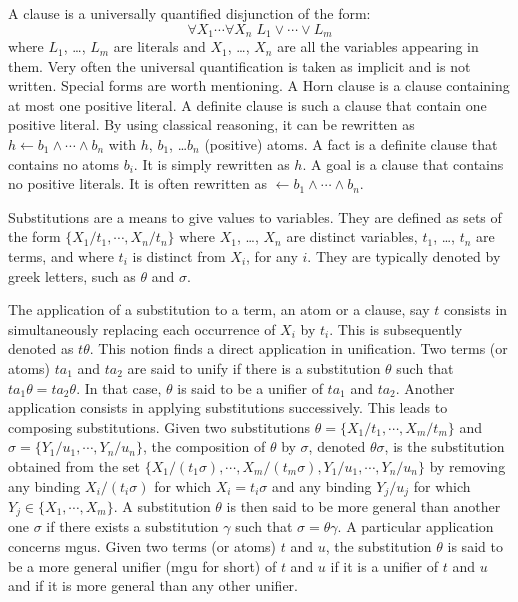 A clause is a universally quantified disjunction of the form:
\[ \forall X_1 \cdots \forall X_n \; L_1 \vee \cdots \vee L_m \]
where $L_1$, \ldots, $L_m$ are literals and $X_1$, \ldots, $X_n$ are all the variables appearing in them. 
Very often the universal quantification is taken as implicit and is not
written.  Special forms are worth mentioning.
A Horn clause is a clause containing at most one positive literal. A
definite clause is such a clause that contain one positive
literal. By using classical reasoning, 
it can be rewritten as
\( h \leftarrow b_1 \wedge \cdots \wedge b_n \)
with $h$, $b_1$, \ldots $b_n$ (positive) atoms.
A fact is a definite clause that contains no atoms $b_i$. It is simply rewritten as \( h \).
A goal is a clause that contains no positive literals. It is often rewritten as 
\( \leftarrow b_1 \wedge \cdots \wedge b_n \).

Substitutions are a means to give values to variables. They are defined as sets of the form 
\( \{ X_1/t_1, \cdots, X_n/t_n \} \)
where $X_1$, \ldots, $X_n$ are distinct variables,
$t_1$, \ldots, $t_n$ are terms, and where $t_i$ is distinct from $X_i$,
for any $i$. They are typically denoted by greek letters, such as $\theta$ and $\sigma$.

The application of a substitution to a term, an atom or a clause, say $t$ consists in simultaneously replacing each occurrence of $X_i$ by
$t_i$. This is subsequently denoted as $t\theta$. 
This notion finds a direct application in unification.
Two terms (or atoms) $ta_1$ and $ta_2$ are said to unify if there is a
substitution $\theta$ such that \( ta_1\theta = ta_2\theta \).  In
that case, $\theta$ is said to be a unifier of $ta_1$ and $ta_2$.
Another application consists in applying substitutions
successively. This leads to composing substitutions.
Given two substitutions $\theta = \{ X_1/t_1, \cdots, X_m/t_m \}$ and
$\sigma = \{ Y_1/u_1, \cdots, Y_n/u_n \}$, the composition of $\theta$ by $\sigma$, denoted
$\theta\sigma$, is the substitution obtained from the set
$\{ X_1/(t_1\sigma), \cdots, X_m/(t_m\sigma), Y_1/u_1, \cdots, Y_n/u_n \}$
by removing any binding $X_i/(t_i\sigma)$ for which $X_i = t_i\sigma$
and any binding $Y_j/u_j$ for which $Y_j \in \{ X_1, \cdots, X_m \}$.
A substitution  
$\theta$ is then said to be more general than another one $\sigma$ if there exists a substitution $\gamma$ such
that $\sigma = \theta\gamma$. A particular application concerns mgus. Given two terms (or atoms) $t$ and $u$, the substitution $\theta$ is
said to be a more general unifier (mgu for short) of $t$ and $u$ if it
is a unifier of $t$ and $u$ and if it is more general than any other
unifier.

